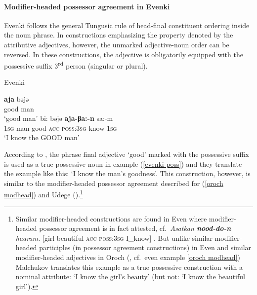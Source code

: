 \paragraph*{Modifier\hyp{}headed possessor agreement in Evenki}
Evenki follows the general Tungusic rule of head-final constituent ordering inside the noun phrase. In constructions emphasizing the property denoted by the attributive adjectives, however, the unmarked adjective-noun order can be reversed. In these constructions, the adjective is obligatorily equipped with the possessive suffix 3\textsuperscript{rd} person (singular or plural).
\begin{exe}
\ex 
\rm{Evenki \citep[18]{bulatova-etal1999}}
\begin{xlist}
\ex	
\gll	\textbf{aja} bəjə\\
	good man\\
\glt	‘good man’
\ex \label{evenki poss}
\gll	bi: bəjə \textbf{aja-βa:-n} sa:-m\\
	\textsc{1sg} man good-\textsc{acc}-\textsc{poss:3sg} know-\textsc{1sg}\\
\glt	‘I know the GOOD man’
\end{xlist}
\end{exe}
According to \citet[18]{bulatova-etal1999}, the phrase final adjective ‘good’ marked with the possessive suffix is used as a true possessive noun in example (\ref{evenki poss}) and they translate the example like this: ‘I know the man's goodness’. This construction, however, is similar to the modifier\hyp{}headed possessor agreement described for  (\ref{oroch modhead}) and Udege (\citealt[485, passim]{nikolaeva-etal2001}).\footnote{Similar modifier\hyp{}headed constructions are found in Even where modifier\hyp{}headed possessor agreement is in fact attested, cf.~\textit{Asatkan \textbf{nood-do-n} haaram.} [girl beautiful-\textsc{acc}-\textsc{poss:3sg} I\_know] \citep[11]{malchukov1995}. But unlike similar modifier\hyp{}headed participles (in possessor agreement constructions) in Even \citep[31]{malchukov1995} and similar modifier\hyp{}headed adjectives in Oroch (\citealt{malchukov2000}, cf.~even example \ref{oroch modhead}) Malchukov translates this example as a true possessive construction with a nominal attribute: ‘I know the girl's beauty’ (but not: ‘I know the beautiful girl’).}

